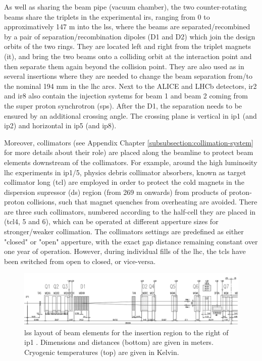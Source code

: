 \documentclass[encoding=utf8,british]{tumphthesis}
\begin{document}
As well as sharing the beam pipe (vacuum chamber), the two counter-rotating beams share the triplets in the experimental \acrshort{ir}s, ranging from 0 to approximatively 147 m into the \acrshort{lss}, where the beams are separated/recombined by a pair of separation/recombination dipoles (D1 and D2) which join the design orbits of the two rings. They are located left and right from the triplet magnets (\acrshort{it}), and bring the two beams onto a colliding orbit at the interaction point and then separate them again beyond the collision point. They are also used as in several insertions where they are needed to change the beam separation from/to the nominal 194 mm in the \acrshort{lhc} arcs. Next to the ALICE and LHCb detectors, \acrshort{ir}2 and \acrshort{ir}8 also contain the injection systems for beam 1 and beam 2 coming from the super proton synchrotron (\acrshort{sps}). After the D1, the separation needs to be ensured by an additional crossing angle. The crossing plane is vertical in \acrshort{ip}1 (and \acrshort{ip}2) and horizontal in \acrshort{ip}5 (and \acrshort{ip}8). 

Moreover, collimators (see Appendix Chapter \ref{subsubsection:collimation-system} for more details about their role) are placed along the beamline to protect beam elements downstream of the collimators. For example, around the high luminosity \acrshort{lhc} experiments in \acrshort{ip}1/5, physics debris collimator absorbers, known as target collimator long (\acrshort{tcl}) are employed in order to protect the cold magnets in the dispersion supressor (\acrshort{ds}) region (from 269 m onwards) from products of proton‐proton collisions, such that magnet quenches from overheating are avoided. There are three such collimators, numbered according to the half-cell they are placed in (\acrshort{tcl}4, 5 and 6), which can be operated at different apperture sizes for stronger/weaker collimation. The collimators settings are predefined as  either "closed" or "open" apperture, with the exact gap distance remaining constant over one year of operation. However, during individual fills of the \acrshort{lhc}, the \acrshort{tcl}s have been switched from open to closed, or vice-versa.


\begin{figure}[H]
    \centering
    \includegraphics[width=1.0\linewidth]{figures/LSS-layout-lhc-report.png}
    \caption{\acrshort{lss} layout of beam elements for the insertion region to the right of \acrshort{ip}1 \cite{LHC-design-report}. Dimensions and distances (bottom) are given in meters. Cryogenic temperatures (top) are given in Kelvin.}
    \label{fig:LSS-layout-lhc-design-report}
\end{figure}
\end{document}
